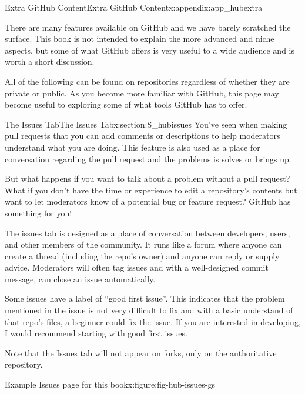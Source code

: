 \documentclass[oneside,10pt,]{book}
\begin{document}
\begin{appendixptx}{Extra GitHub Content}{}{Extra GitHub Content}{}{}{x:appendix:app_hubextra}
%
\begin{introduction}{}%
There are many features available on GitHub and we have barely scratched the surface. This book is not intended to explain the more advanced and niche aspects, but some of what GitHub offers is very useful to a wide audience and is worth a short discussion.%
\par
All of the following can be found on repositories regardless of whether they are private or public. As you become more familiar with GitHub, this page may become useful to exploring some of what tools GitHub has to offer.%
\end{introduction}%
%
%
\typeout{************************************************}
\typeout{************************************************}
%
\begin{sectionptx}{The Issues Tab}{}{The Issues Tab}{}{}{x:section:S_hubissues}
%
%
You've seen when making pull requests that you can add comments or descriptions to help moderators understand what you are doing. This feature is also used as a place for conversation regarding the pull request and the problems is solves or brings up.%
\par
But what happens if you want to talk about a problem without a pull request? What if you don't have the time or experience to edit a repository's contents but want to let moderators know of a potential bug or feature request? GitHub has something for you!%
\par
The issues tab is designed as a place of conversation between developers, users, and other members of the community. It runs like a forum where anyone can create a thread (including the repo's owner) and anyone can reply or supply advice. Moderators will often tag issues and with a well-designed commit message, can close an issue automatically.%
\par
Some issues have a label of ``good first issue''. This indicates that the problem mentioned in the issue is not very difficult to fix and with a basic understand of that repo's files, a beginner could fix the issue. If you are interested in developing, I would recommend starting with good first issues.%
\par
Note that the Issues tab will not appear on forks, only on the authoritative repository.%
\begin{figureptx}{Example Issues page for this book}{x:figure:fig-hub-issues-gs}{}%

\end{figureptx}
\end{sectionptx}
\end{appendixptx}
\end{document}
